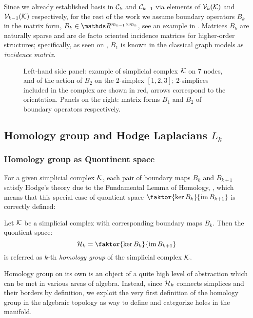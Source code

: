 Since we already established basis in \( \mathcal{C}_k \) and \( \mathcal{C}_{k-1}\) via elements of \( \mathcal{V}_{k}(\mathcal{K}) \) and \( \mathcal{V}_{k-1}(\mathcal{K}) \) respectively, for the rest of the work we assume boundary operators \( B_k \) in the matrix form, \( B_k \in \ds R^{ m_{k-1} \times m_k }\), see an example in . Matrices \( B_k \) are naturally sparse and are de facto oriented incidence matrices for higher-order structures; specifically, as seen on , \( B_1 \) is known in the classical graph models as \emph{incidence matrix}.
\begin{figure}[hbtp]
      \centering
      
      \caption{
            Left-hand side panel: example of simplicial complex $\mathcal{K}$ on $7$ nodes, and of the action of $B_2$ on the 2-simplex $[1,2,3]$; $2$-simplices included in the complex are shown in red, arrows correspond to the orientation. Panels on the right: matrix forms $B_1$ and $B_2$ of boundary operators respectively. \label{fig:bound_mat}
      }
\end{figure}



\subsection{ Homology group and Hodge Laplacians \( L_k \) }

\subsubsection{Homology group as Quontinent space}

For a given simplicial complex \( \mathcal{K} \), each pair of boundary maps \( B_k \) and \( B_{k+1 } \) satisfy Hodge's theory due to the Fundamental Lemma of Homology, , which means that this special case of quontient space \( \faktor{ \ker B_k }{ \im B_{k+1} } \) is correctly defined:

\begin{definition}
      Let \( \mathcal{K} \) be a simplicial complex with corresponding boundary maps \( B_k \). Then the quontient space:
      \begin{equation}
            \mc H_k = \faktor{ \ker B_k }{ \im B_{k+1} } 
      \end{equation}
      is referred as  \(k\)-th \emph{homology group} of the simplicial complex \( \mathcal{K} \).
\end{definition}

Homology group on its own is an object of a quite high level of abstraction which can be met in various areas of algebra. Instead, since \( \mathcal{H}_k \) connects simplices and their borders by definition, we exploit the very first definition of the homology group in the algebraic topology as way to define and categorize holes in the manifold. 


